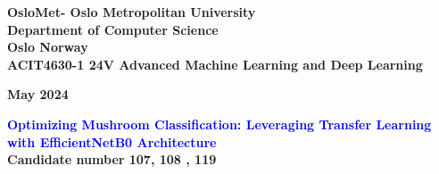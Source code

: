 \documentclass[12pt, a4paper, oneside, openright]{book}
\begin{document}

\begin{titlepage}
\begin{center}
\textbf{\LARGE OsloMet- Oslo Metropolitan University}\\[0.5cm] 
\textbf{\Large Department of Computer Science}\\[0.2cm]
\textbf{\Large Oslo Norway }\\[0.8cm]
\textbf{\Large ACIT4630-1 24V Advanced Machine Learning and Deep Learning}\\[0.2cm]
\vspace{20pt}


\begin{center}
\textbf{May 2024}\\
\end{center}
\vspace{20pt}

\par
\vspace{20pt}
\textbf{\Large \textcolor{blue}{Optimizing Mushroom Classification: Leveraging Transfer Learning with EfficientNetB0 Architecture}}\\
\vspace{25pt}
\vspace{1pt}
\textbf{{ Candidate number 107, 108 , 119 }}\\[0.1cm]
\vspace{25pt}


\end{center}

\par
\vfill
\end{titlepage}


\newpage
\tableofcontents









\appendix




% 

\let\section\chapter






\end{document}
